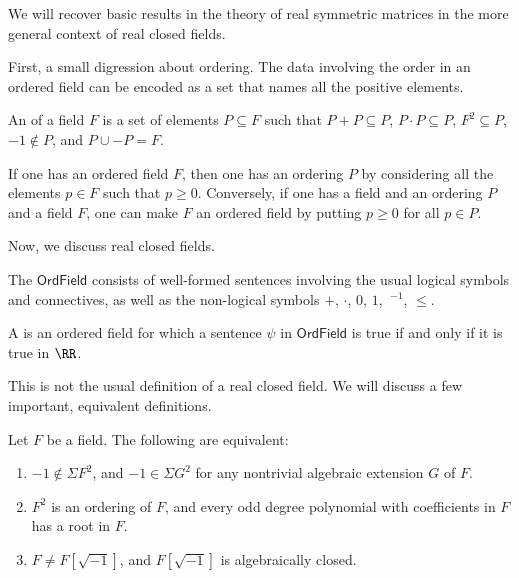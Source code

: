\documentclass{article}
\newcommand*\OrdField{\mathsf{OrdField}}
\begin{document}
We will recover basic results in the theory of real symmetric matrices in the more general context of real closed fields.

First, a small digression about ordering.
The data involving the order in an ordered field can be encoded as a set that names all the positive elements.

\begin{definition}
    An  of a field $F$ is a set of elements $P \subseteq F$ such that $P+P\subseteq P$, $P \cdot P \subseteq P$, $F^2 \subseteq P$, $-1\notin P$, and $P \cup -P = F$.
\end{definition}

If one has an ordered field $F$, then one has an ordering $P$ by considering all the elements $p \in F$ such that $p \geq 0$.
Conversely, if one has a field and an ordering $P$ and a field $F$, one can make $F$ an ordered field by putting $p \geq 0$ for all $p \in P$.

Now, we discuss real closed fields.

\begin{definition}
The  $\OrdField$ consists of well-formed sentences involving the usual logical symbols and connectives, as well as the non-logical symbols $+$, $\cdot$, $0$, $1$, $\ ^{-1}$, $\leq$.

    A  is an ordered field for which a sentence $\psi$ in $\OrdField$ is true if and only if it is true in $\RR$.
\end{definition}

This is not the usual definition of a real closed field.
We will discuss a few important, equivalent definitions.

\begin{theorem}
    \label{thm:ArtinSchreier1926}
    Let $F$ be a field.
    The following are equivalent:
    \begin{enumerate}[label=(\roman*)]
        \item 
            $-1 \notin \Sigma F^2$, and $-1 \in \Sigma G^2$ for any nontrivial algebraic extension $G$ of $F$.
        \item 
            $F^2$ is an ordering of $F$, and every odd degree polynomial with coefficients in $F$ has a root in $F$.
        \item 
            $F \neq F[\sqrt{-1}]$, and $F[\sqrt{-1}]$ is algebraically closed.
    \end{enumerate}
\end{theorem}
\end{document}
